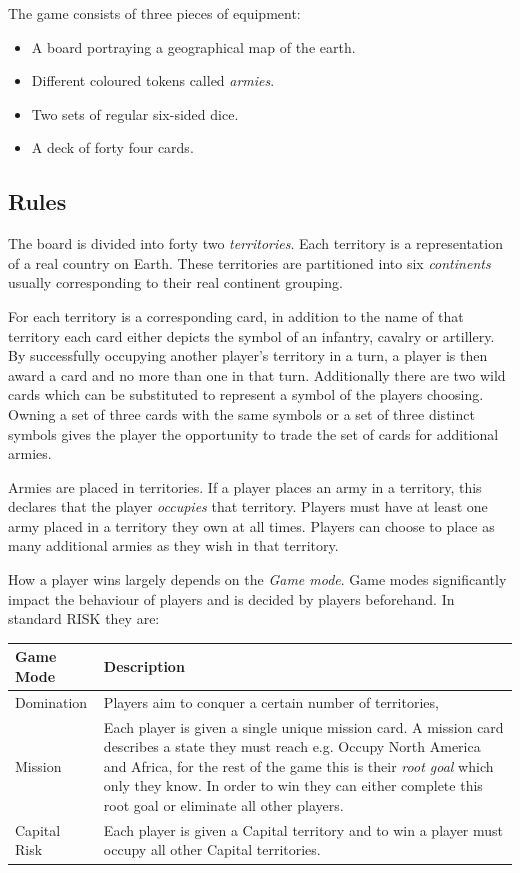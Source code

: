 \documentclass[parskip]{cs4rep}
\begin{document}
The game consists of three pieces of equipment:

\begin{itemize}
\item
A board portraying a geographical map of the earth.
\item
Different coloured tokens called \textit{armies}.
\item
Two sets of regular six-sided dice.
\item
A deck of forty four cards.
\end{itemize}

\subsection{Rules}

The board is divided into forty two \textit{territories}. Each territory is a representation of a real country on Earth. These territories are partitioned into six \textit{continents} usually corresponding to their real continent grouping.

For each territory is a corresponding card, in addition to the name of that territory each card either depicts the symbol of an infantry, cavalry or artillery. By successfully occupying another player's territory in a turn, a player is then award a card and no more than one in that turn. Additionally there are two wild cards which can be substituted to represent a symbol of the players choosing.
Owning a set of three cards with the same symbols or a set of three distinct symbols gives the player the opportunity to trade the set of cards for additional armies.

Armies are placed in territories. If a player places an army in a territory, this declares that the player \textit{occupies} that territory. Players must have at least one army placed in a territory they own at all times. Players can choose to place as many additional armies as they wish in that territory.

How a player wins largely depends on the \textit{Game mode}. Game modes significantly impact the behaviour of players and is decided by players beforehand. In standard RISK they are:
\newline

\begin{tabular}{|l|p{11cm}|}
\hline 
\textbf{Game Mode} & \textbf{Description} \\ 
\hline 
Domination & Players aim to conquer a certain number of territories, \\ 
\hline 
Mission & Each player is given a single unique mission card. A mission card describes a state they must reach e.g. Occupy North America and Africa, for the rest of the game this is their \textit{root goal} which only they know. In order to win they can either complete this root goal or eliminate all other players. \\ 
\hline 
Capital Risk & Each player is given a Capital territory and to win a player must occupy all other Capital territories. \\ 
\hline
\end{tabular} 
\newline
\end{document}
